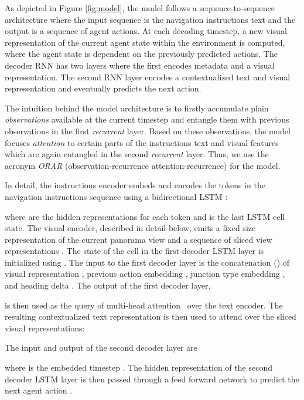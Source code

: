 \documentclass[11pt]{article}
\begin{document}
As depicted in Figure \ref{fig:model}, the model follows a sequence-to-sequence architecture where the input sequence is the navigation instructions text and the output is a sequence of agent actions. At each decoding timestep, a new visual representation of the current agent state within the environment is computed, where the agent state is dependent on the previously predicted actions.
The decoder RNN has two layers where the first encodes metadata and a visual representation. The second RNN layer encodes a contextualized text and visual representation and eventually predicts the next action.

The intuition behind the model architecture is to firstly accumulate plain \textit{observations} available at the current timestep and entangle them with previous observations in the first \textit{recurrent} layer. Based on these observations, the model focuses \textit{attention} to certain parts of the instructions text and visual features which are again entangled in the second \textit{recurrent} layer. Thus, we use the acronym \textit{ORAR} (observation-recurrence attention-recurrence) for the model.

In detail, the instructions encoder embeds and encodes the tokens in the navigation instructions sequence  using a bidirectional LSTM \cite{bilstm}:

where  are the hidden representations for each token and  is the last LSTM cell state. The visual encoder, described in detail below, emits a fixed size representation  of the current panorama view and a sequence of sliced view representations . The state  of the cell in the first decoder LSTM layer is initialized using . The input to the first decoder layer is the concatenation () of visual representation , previous action embedding , junction type embedding , and heading delta . The output of the first decoder layer,

is then used as the query of multi-head attention~\cite{vaswani-etal-2017-attention} over the text encoder. The resulting contextualized text representation  is then used to attend over the sliced visual representations:

The input and output of the second decoder layer are

where  is the embedded timestep . The hidden representation  of the second decoder LSTM layer is then passed through a feed forward network to predict the next agent action .
\end{document}
